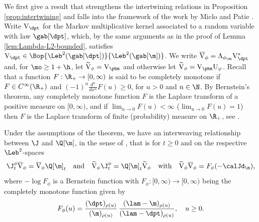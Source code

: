 We first give a result that strengthens the intertwining relations in Proposition \ref{prop:intertwining} and falls into the framework of the work by Miclo and Patie \cite{Patie-Miclo}. Write $\mathrm{V}_{\dpt}$ for the Markov multiplicative kernel associated to a random variable with law $\gab[\dpt]$, which, by the same arguments as in the proof of Lemma \ref{lem:Lambda-L2-bounded}, satisfies $\mathrm{V}_{\dpt} \in \Bop{\Leb^2(\gab[\dpt])}{\Leb^2(\gab[\m])}$. We write $\overline{\mathrm{V}}_\phi = \Lambda_{\phi_{\dz}} \mathrm{V}_{\dpt}^*$ and, for $\mo \geq 1+\h$, let $\widetilde{\mathrm{V}}_\phi = \mathrm{V}_{\phm}$ and otherwise let $\widetilde{\mathrm{V}}_\phi = \mathrm{V}_{\phm} \mathrm{U}_\varphi$. Recall that a function $F:\R_+ \to [0,\infty)$ is said to be completely monotone if $F \in C^\infty(\R_+)$ and $(-1)^n \frac{d^n}{dx^n} F(u) \geq 0$, for $u > 0$ and $n \in \N$. By Bernstein's theorem, any completely monotone function $F$ is the Laplace transform of a positive measure on $[0,\infty)$, and if $\lim_{u \to 0} F(u) < \infty$ (\resp $\lim_{u \to 0} F(u) =1$) then $F$ is the Laplace transform of finite (\resp probability) measure on $\R_+$, see \eg \cite[Chap.\,1]{SchillingSongVondracek10}.

\begin{proposition}
\label{prop:cmir}
Under the assumptions of the theorem, we have an interweaving relationship between $\J$ and $\Q[\m]$, in the sense of \cite{Patie-Miclo}, that is for $t \geq 0$ and on the respective $\Leb^2$-spaces
\begin{equation}
\label{eq:cmir}
\J_t^\phi \overline{\mathrm{V}}_\phi = \overline{\mathrm{V}}_\phi \Q[\m]_t \quad \text{and} \quad \widetilde{\mathrm{V}}_\phi \J_t^\phi = \Q[\m]_t \widetilde{\mathrm{V}}_\phi \quad \text{with} \quad \widetilde{\mathrm{V}}_\phi \overline{\mathrm{V}}_\phi = F_\phi(-\calJd_\m),
\end{equation}
where $-\log F_\phi$ is a Bernstein function with $F_\phi:[0,\infty) \to [0,\infty)$ being the completely monotone function given by
\begin{equation*}
F_\phi(u) = \frac{(\dpt)_{\rho(u)}}{(\m)_{\rho(u)}}\, \frac{(\lam-\m)_{\rho(u)}}{(\lam-\dpt)_{\rho(u)}} , \quad u \geq 0.
\end{equation*}
\end{proposition}

